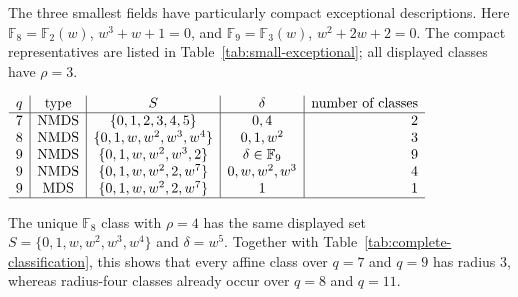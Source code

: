 ﻿\documentclass[11pt]{article}
\newcommand{\F}{\mathbb F}
\theoremstyle{plain}
\theoremstyle{definition}
\begin{document}
The three smallest fields have particularly compact exceptional
descriptions.  Here \(\F_8=\F_2(w)\), \(w^3+w+1=0\), and
\(\F_9=\F_3(w)\), \(w^2+2w+2=0\).  The compact representatives are listed
in Table~\ref{tab:small-exceptional}; all displayed classes have \(\rho=3\).
\begin{center}
\label{tab:small-exceptional}
\(
\begin{array}{c|c|c|c|r}
q & \hbox{type} & S & \delta & \hbox{number of classes}\\
\hline
7 & \mathrm{NMDS} & \{0,1,2,3,4,5\} & 0,4 & 2\\
8 & \mathrm{NMDS} & \{0,1,w,w^2,w^3,w^4\} & 0,1,w^2 & 3\\
9 & \mathrm{NMDS} & \{0,1,w,w^2,w^3,2\} & \delta\in\F_9 & 9\\
9 & \mathrm{NMDS} & \{0,1,w,w^2,2,w^7\} & 0,w,w^2,w^3 & 4\\
9 & \mathrm{MDS} & \{0,1,w,w^2,2,w^7\} & 1 & 1\\
\hline
\end{array}
\)
\end{center}
The unique \(\F_8\) class with \(\rho=4\) has the same displayed set
\(S=\{0,1,w,w^2,w^3,w^4\}\) and \(\delta=w^5\).
Together with Table~\ref{tab:complete-classification}, this shows that
every affine class over \(q=7\) and \(q=9\) has radius \(3\), whereas
radius-four classes already occur over \(q=8\) and \(q=11\).
\end{document}
